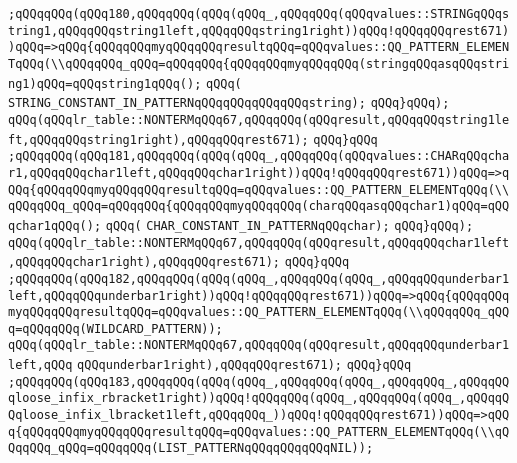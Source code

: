 \verb|;qQQqqQQq(qQQq180,qQQqqQQq(qQQq(qQQq_,qQQqqQQq(qQQqvalues::STRINGqQQqstring1,qQQqqQQqstring1left,qQQqqQQqstring1right))qQQq!qQQqqQQqrest671))qQQq=>qQQq{qQQqqQQqmyqQQqqQQqresultqQQq=qQQqvalues::QQ_PATTERN_ELEMENTqQQq(\\qQQqqQQq_qQQq=qQQqqQQq{qQQqqQQqmyqQQqqQQq(stringqQQqasqQQqstring1)qQQq=qQQqstring1qQQq();|\newline
\verb|qQQq(|\newline
\verb|STRING_CONSTANT_IN_PATTERNqQQqqQQqqQQqqQQqstring);|\newline
\verb|qQQq}qQQq);|\newline
\verb|qQQq(qQQqlr_table::NONTERMqQQq67,qQQqqQQq(qQQqresult,qQQqqQQqstring1left,qQQqqQQqstring1right),qQQqqQQqrest671);|\newline
\verb|qQQq}qQQq|\newline
\verb|;qQQqqQQq(qQQq181,qQQqqQQq(qQQq(qQQq_,qQQqqQQq(qQQqvalues::CHARqQQqchar1,qQQqqQQqchar1left,qQQqqQQqchar1right))qQQq!qQQqqQQqrest671))qQQq=>qQQq{qQQqqQQqmyqQQqqQQqresultqQQq=qQQqvalues::QQ_PATTERN_ELEMENTqQQq(\\qQQqqQQq_qQQq=qQQqqQQq{qQQqqQQqmyqQQqqQQq(charqQQqasqQQqchar1)qQQq=qQQqchar1qQQq();|\newline
\verb|qQQq(|\newline
\verb|CHAR_CONSTANT_IN_PATTERNqQQqchar);|\newline
\verb|qQQq}qQQq);|\newline
\verb|qQQq(qQQqlr_table::NONTERMqQQq67,qQQqqQQq(qQQqresult,qQQqqQQqchar1left,qQQqqQQqchar1right),qQQqqQQqrest671);|\newline
\verb|qQQq}qQQq|\newline
\verb|;qQQqqQQq(qQQq182,qQQqqQQq(qQQq(qQQq_,qQQqqQQq(qQQq_,qQQqqQQqunderbar1left,qQQqqQQqunderbar1right))qQQq!qQQqqQQqrest671))qQQq=>qQQq{qQQqqQQqmyqQQqqQQqresultqQQq=qQQqvalues::QQ_PATTERN_ELEMENTqQQq(\\qQQqqQQq_qQQq=qQQqqQQq(WILDCARD_PATTERN));|\newline
\verb|qQQq(qQQqlr_table::NONTERMqQQq67,qQQqqQQq(qQQqresult,qQQqqQQqunderbar1left,qQQq|\newline
\verb|qQQqunderbar1right),qQQqqQQqrest671);|\newline
\verb|qQQq}qQQq|\newline
\verb|;qQQqqQQq(qQQq183,qQQqqQQq(qQQq(qQQq_,qQQqqQQq(qQQq_,qQQqqQQq_,qQQqqQQqloose_infix_rbracket1right))qQQq!qQQqqQQq(qQQq_,qQQqqQQq(qQQq_,qQQqqQQqloose_infix_lbracket1left,qQQqqQQq_))qQQq!qQQqqQQqrest671))qQQq=>qQQq{qQQqqQQqmyqQQqqQQqresultqQQq=qQQqvalues::QQ_PATTERN_ELEMENTqQQq(\\qQQqqQQq_qQQq=qQQqqQQq(LIST_PATTERNqQQqqQQqqQQqNIL));|\newline
